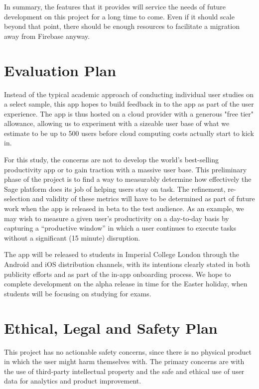 In summary, the features that it provides will service the needs of future development on this project for a long time to come. Even if it should scale beyond that point, there should be enough resources to facilitate a migration away from Firebase anyway.

\section{Evaluation Plan}
Instead of the typical academic approach of conducting individual user studies on a select sample, this app hopes to build feedback in to the app as part of the user experience. The app is thus hosted on a cloud provider with a generous "free tier" allowance, allowing us to experiment with a sizeable user base of what we estimate to be up to 500 users before cloud computing costs actually start to kick in.

For this study, the concerns are not to develop the world's best-selling productivity app or to gain traction with a massive user base. This preliminary phase of the project is to find a way to measurably determine how effectively the Sage platform does its job of helping users stay on task. The refinement, re-selection and validity of these metrics will have to be determined as part of future work when the app is released in beta to the test audience. As an example, we may wish to measure a given user's productivity on a day-to-day basis by capturing a ``productive window'' in which a user continues to execute tasks without a significant (15 minute) disruption.

The app will be released to students in Imperial College London through the Android and iOS distribution channels, with its intentions clearly stated in both publicity efforts and as part of the in-app onboarding process. We hope to complete development on the alpha release in time for the Easter holiday, when students will be focusing on studying for exams.

\section{Ethical, Legal and Safety Plan}
This project has no actionable safety concerns, since there is no physical product in which the user might harm themselves with. The primary concerns are with the use of third-party intellectual property and the safe and ethical use of user data for analytics and product improvement.

